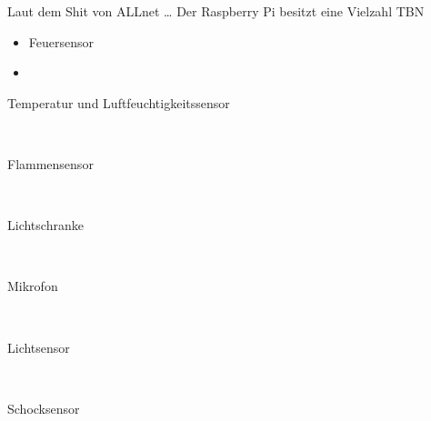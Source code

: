 
Laut dem Shit von ALLnet \cite{111861pd90} \ldots
Der Raspberry Pi besitzt eine Vielzahl  TBN
\begin{itemize}
\item Feuersensor
\item
\end{itemize}

\begin{description}
\item[Temperatur und Luftfeuchtigkeitssensor] \hfill \\
\item[Flammensensor]\hfill \\
\item[Lichtschranke]\hfill \\
\item[Mikrofon]\hfill \\
\item[Lichtsensor]\hfill \\
\item[Schocksensor]\hfill \\
\end{description}